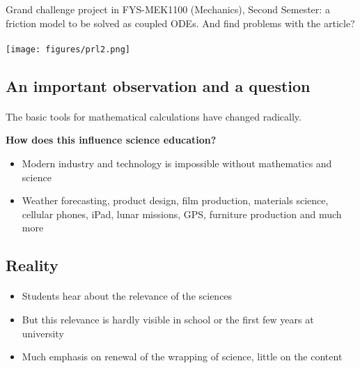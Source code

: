 \documentclass[%
twoside,                 %
final,                   %
10pt]{article}
\begin{document}
Grand challenge project in FYS-MEK1100 (Mechanics), Second Semester: a friction model to be solved as coupled ODEs. And find problems with the article?



\paragraph{}


\centerline{\texttt{[image: figures/prl2.png]}}




\subsection*{An important observation and a  question}

\paragraph{}

The basic tools for mathematical calculations have changed radically.

\textbf{How does this influence science education?}

\begin{itemize}
\item Modern industry and technology is impossible without mathematics and science

\item Weather forecasting, product design, film production, materials science, cellular phones, iPad, lunar missions, GPS, furniture production and much more
\end{itemize}

\noindent




\subsection*{Reality}

\paragraph{}

\begin{itemize}
\item Students hear about the relevance of the sciences

\item But this relevance is hardly visible in school or the first few years at university

\item Much emphasis on renewal of the wrapping of science, little on the content
\end{itemize}
\end{document}
